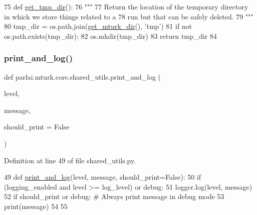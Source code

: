 \begin{DoxyCode}
75 \textcolor{keyword}{def }\hyperlink{namespaceparlai_1_1mturk_1_1core_1_1shared__utils_aa0c7ddb9db866e2f19ec6a83112fc9d2}{get\_tmp\_dir}():
76     \textcolor{stringliteral}{"""}
77 \textcolor{stringliteral}{    Return the location of the temporary directory in which we store things related to a}
78 \textcolor{stringliteral}{    run but that can be safely deleted.}
79 \textcolor{stringliteral}{    """}
80     tmp\_dir = os.path.join(\hyperlink{namespaceparlai_1_1mturk_1_1core_1_1shared__utils_aabd480fc6090e1fa769ff3926f7e842d}{get\_mturk\_dir}(), \textcolor{stringliteral}{'tmp'})
81     \textcolor{keywordflow}{if} \textcolor{keywordflow}{not} os.path.exists(tmp\_dir):
82         os.mkdir(tmp\_dir)
83     \textcolor{keywordflow}{return} tmp\_dir
84 \end{DoxyCode}
\mbox{\label{namespaceparlai_1_1mturk_1_1core_1_1shared__utils_a9ffb0cdb3846323e276281cbeb16979a}} 
\subsubsection{\texorpdfstring{print\+\_\+and\+\_\+log()}{print\_and\_log()}}
{\footnotesize\ttfamily def parlai.\+mturk.\+core.\+shared\+\_\+utils.\+print\+\_\+and\+\_\+log (\begin{DoxyParamCaption}\item[{}]{level,  }\item[{}]{message,  }\item[{}]{should\+\_\+print = {\ttfamily False} }\end{DoxyParamCaption})}



Definition at line 49 of file shared\+\_\+utils.\+py.


\begin{DoxyCode}
49 \textcolor{keyword}{def }\hyperlink{namespaceparlai_1_1mturk_1_1core_1_1shared__utils_a9ffb0cdb3846323e276281cbeb16979a}{print\_and\_log}(level, message, should\_print=False):
50     \textcolor{keywordflow}{if} (logging\_enabled \textcolor{keywordflow}{and} level >= log\_level) \textcolor{keywordflow}{or} debug:
51         logger.log(level, message)
52     \textcolor{keywordflow}{if} should\_print \textcolor{keywordflow}{or} debug:  \textcolor{comment}{# Always print message in debug mode}
53         print(message)
54 
55 
\end{DoxyCode}
\mbox{\label{namespaceparlai_1_1mturk_1_1core_1_1shared__utils_a8446a65c83fee3ccdfb7484ff5f3eedd}} 

